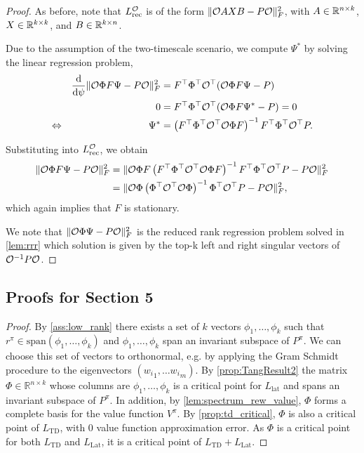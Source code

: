 \ReparameterizationInvarianceObs*

\begin{proof}
    
As before, note that $L_\mathrm{rec}^{\mathcal{O}}$ is of the form $\lVert {\mathcal{O}} AXB - P{\mathcal{O}} \rVert_F^2$, with $A \in \mathbb{R}^{n \times k}$, $X \in \mathbb{R}^{k \times k}$, and $B \in \mathbb{R}^{k \times n}$.

Due to the assumption of the two-timescale scenario, we compute $\Psi^*$ by solving the linear regression problem,
\begin{align*}
    &&\frac{\mathrm{d}}{\mathrm{d} \psi} \lVert {\mathcal{O}} \Phi F \Psi - P {\mathcal{O}} \rVert_F^2 &= F^\top \Phi^\top {\mathcal{O}}^\top ({\mathcal{O}} \Phi F \Psi - P)\\
    &&0 &=  F^\top \Phi^\top {\mathcal{O}}^\top ({\mathcal{O}} \Phi F \Psi^* - P) = 0 \\
    \Leftrightarrow &&
    \Psi^* &= \left(F^\top \Phi^\top {\mathcal{O}}^\top {\mathcal{O}} \Phi F\right)^{-1} F^\top \Phi^\top {\mathcal{O}}^\top P.
\end{align*}

Substituting into $L_\mathrm{rec}^{\mathcal{O}}$, we obtain
\begin{align*}
    \lVert {\mathcal{O}} \Phi F \Psi- P {\mathcal{O}} \rVert_F^2 & = \lVert {\mathcal{O}} \Phi F \left(F^\top \Phi^\top {\mathcal{O}}^\top {\mathcal{O}} \Phi F\right)^{-1} F^\top \Phi^\top {\mathcal{O}}^\top P - P{\mathcal{O}} \rVert_F^2 \\
    & = \lVert {\mathcal{O}} \Phi \left( \Phi^\top {\mathcal{O}}^\top {\mathcal{O}} \Phi\right)^{-1} \Phi^\top {\mathcal{O}}^\top P - P{\mathcal{O}} \rVert_F^2,
\end{align*}
which again implies that $F$ is stationary.

We note that $\lVert {\mathcal{O}} \Phi\Psi - P{\mathcal{O}}\rVert^2_F$ is the reduced rank regression problem solved in \autoref{lem:rrr} which solution is given by the top-k left and right singular vectors of ${\mathcal{O}}^{-1} P {\mathcal{O}}$.
\end{proof}

\subsection*{Proofs for Section 5}


\BYOLCombined*
\begin{proof}
        By \autoref{ass:low_rank} there exists a set of $k$ vectors $\phi_1,\dots,\phi_k$ such that $r^\pi \in \text{span}(\phi_1,\dots,\phi_k)$ and $\phi_1,\dots,\phi_k$ span an invariant subspace of $P^\pi$.
        We can choose this set of vectors to orthonormal, e.g. by applying the Gram Schmidt procedure to the eigenvectors $({w_i}_1,\dots{w_i}_m)$. 
        By \autoref{prop:TangResult2} the matrix $\Phi\in \mathbb{R}^{n\times k}$ whose columns are $\phi_1,\dots,\phi_k$ is a critical point for $L_\text{lat}$ and spans an invariant subspace of $P^\pi$.
        In addition, by \autoref{lem:spectrum_rew_value}, $\Phi$ forms a complete basis for the value function $V^\pi$.
        By \autoref{prop:td_critical}, $\Phi$ is also a critical point of $L_\text{TD}$, with $0$ value function approximation error. 
        As $\Phi$ is a critical point for both $L_\text{TD}$ and $L_\text{Lat}$, it is a critical point of $L_\text{TD} + L_\text{Lat}$.

\end{proof}

